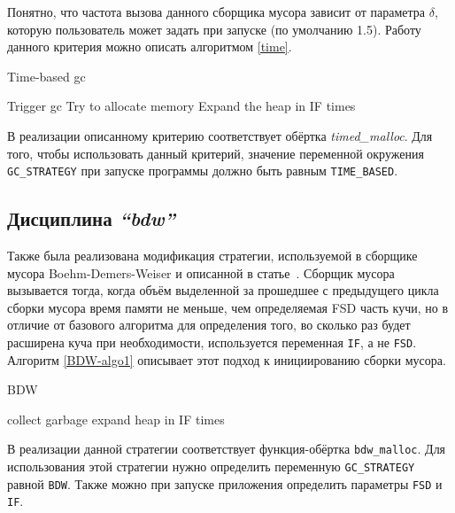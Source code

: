 Понятно, что частота вызова данного сборщика мусора зависит от параметра $\delta$, 
которую пользователь может задать при запуске (по умолчанию 1.5).
Работу данного критерия можно описать алгоритмом \ref{time}. 

\begin{algorithm}
\caption{Time-based gc}
\label{time}
\begin{algorithmic}[3]
    \State Trigger gc
\EndIf
\State Try to allocate memory
    \State Expand the heap in IF times
\EndIf

\end{algorithmic}
\end{algorithm}

В реализации описанному критерию соответствует обёртка \emph{timed\_malloc}. Для того, чтобы использовать
данный критерий, значение переменной окружения \texttt{GC\_STRATEGY} при запуске программы должно быть 
равным \texttt{TIME\_BASED}.

\subsection{Дисциплина \emph{``bdw''}} 

Также была реализована модификация стратегии, используемой в сборщике мусора 
Boehm-Demers-Weiser и описанной в статье~\cite{BDW}. 
Сборщик мусора вызывается тогда, когда объём выделенной за прошедшее с предыдущего
цикла сборки мусора
время памяти не меньше, чем определяемая FSD часть кучи, но в отличие от 
базового алгоритма для определения того, во сколько раз будет расширена куча 
при необходимости, используется переменная \texttt{IF}, а не \texttt{FSD}. Алгоритм \ref{BDW-algo1}
описывает этот подход к инициированию сборки мусора. 

\begin{algorithm}[hbt]
\caption{BDW}
\label{BDW-algo1}
\begin{algorithmic}[1]
        \State collect garbage
    \Else 
        \State expand heap in IF times
    \EndIf
\EndIf
\end{algorithmic}
\end{algorithm}

В реализации данной стратегии соответствует функция-обёртка \texttt{bdw\_malloc}. Для использования
этой стратегии нужно определить переменную \texttt{GC\_STRATEGY} равной \texttt{BDW}. Также можно при запуске приложения
определить параметры \texttt{FSD} и \texttt{IF}.

